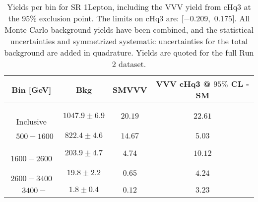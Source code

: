 \begin{table}[!htbp]
    \small
    \center
    \begin{tabular}{c||c|c|c}
    Bin [GeV] & Bkg & SMVVV & \pbox{20cm}{VVV \\ cHq3 @ $95\%$ CL - SM \\ }\\
    \hline
    \pbox{20cm}{ ~ \\Inclusive\\ } & $1047.9 \pm 6.9$ & $20.19$ & $22.61$\\
    \hline
    \pbox{20cm}{ ~ \\$500-1600$\\ } & $822.4 \pm 4.6$ & $14.67$ & $5.03$\\
    \hline
    \pbox{20cm}{ ~ \\$1600-2600$\\ } & $203.9 \pm 4.7$ & $4.74$ & $10.12$\\
    \hline
    \pbox{20cm}{ ~ \\$2600-3400$\\ } & $19.8 \pm 2.2$ & $0.65$ & $4.24$\\
    \hline
    \pbox{20cm}{ ~ \\$3400-$\\ } & $1.8 \pm 0.4$ & $0.12$ & $3.23$\\
\end{tabular}
    \caption{Yields per bin for SR 1Lepton, including the VVV yield from cHq3 at the $95$\% exclusion point. The limits on cHq3 are: [$-0.209$,~$0.175$]. All Monte Carlo background yields have been combined, and the statistical uncertainties and symmetrized systematic uncertainties for the total background are added in quadrature. Yields are quoted for the full Run 2 dataset.}
    \label{tab:1Lepton$binssignal}
\end{table}
